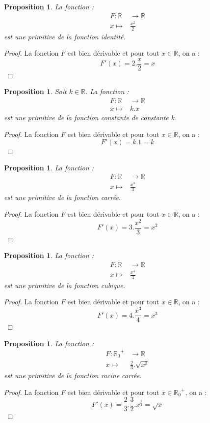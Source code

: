\documentclass[a4paper,fontsize=13pt]{scrreprt}
\theoremstyle{plain}
\newtheorem{pro}[subsection]{Proposition}
\theoremstyle{definition}
\newcommand{\rr}{\mathbb{R}}
\begin{document}
\begin{pro}
La fonction :
\begin{align*}
F : \rr &\to \rr \\
x \mapsto& \frac{x^2}{2}
\end{align*}
est une primitive de la fonction identité.
\end{pro}
\begin{proof}
La fonction $F$ est bien dérivable et pour tout $x\in \rr$, on a :
$$F'(x) = 2.\frac{x}{2} = x$$ 
\end{proof}

\begin{pro}
Soit $k \in \rr$. La fonction :
\begin{align*}
F : \rr &\to \rr \\
x \mapsto& k.x
\end{align*}
est une primitive de la fonction constante de constante $k$.
\end{pro}
\begin{proof}
La fonction $F$ est bien dérivable et pour tout $x\in \rr$, on a :
$$F'(x) = k.1 = k$$ 
\end{proof}

\begin{pro}
La fonction :
\begin{align*}
F : \rr &\to \rr \\
x \mapsto& \frac{x^3}{3}
\end{align*}
est une primitive de la fonction carrée.
\end{pro}
\begin{proof}
La fonction $F$ est bien dérivable et pour tout $x\in \rr$, on a :
$$F'(x) = 3.\frac{x^2}{3} = x^2$$ 
\end{proof}

\begin{pro}
La fonction :
\begin{align*}
F : \rr &\to \rr \\
x \mapsto& \frac{x^4}{4}
\end{align*}
est une primitive de la fonction cubique.
\end{pro}
\begin{proof}
La fonction $F$ est bien dérivable et pour tout $x\in \rr$, on a :
$$F'(x) = 4.\frac{x^3}{4} = x^3$$ 
\end{proof}

\begin{pro}
La fonction :
\begin{align*}
F : {{\rr}_{0}}^{+} &\to \rr \\
x \mapsto& \frac{2}{3}.\sqrt{x^3}
\end{align*}
est une primitive de la fonction racine carrée.
\end{pro}
\begin{proof}
La fonction $F$ est bien dérivable et pour tout $x\in {{\rr}_{0}}^{+}$, on a :
$$F'(x) = \frac{2}{3}.\frac{3}{2}.x^{\frac{1}{2}} = \sqrt{x}$$ 
\end{proof}
\end{document}
